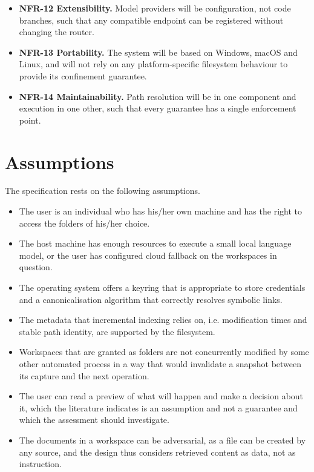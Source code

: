 \documentclass{FastFyp}
\begin{document}
\begin{itemize}
    \item \textbf{NFR-12 Extensibility.} Model providers will be configuration, not code branches, such that any compatible endpoint can be registered without changing the router.
    \item \textbf{NFR-13 Portability.} The system will be based on Windows, macOS and Linux, and will not rely on any platform-specific filesystem behaviour to provide its confinement guarantee.
    \item \textbf{NFR-14 Maintainability.} Path resolution will be in one component and execution in one other, such that every guarantee has a single enforcement point.
\end{itemize}

\section{Assumptions}
The specification rests on the following assumptions.

\begin{itemize}
    \item The user is an individual who has his/her own machine and has the right to access the folders of his/her choice.
    \item The host machine has enough resources to execute a small local language model, or the user has configured cloud fallback on the workspaces in question.
    \item The operating system offers a keyring that is appropriate to store credentials and a canonicalisation algorithm that correctly resolves symbolic links.
    \item The metadata that incremental indexing relies on, i.e. modification times and stable path identity, are supported by the filesystem.
    \item Workspaces that are granted as folders are not concurrently modified by some other automated process in a way that would invalidate a snapshot between its capture and the next operation.
    \item The user can read a preview of what will happen and make a decision about it, which the literature indicates is an assumption and not a guarantee and which the assessment should investigate.
    \item The documents in a workspace can be adversarial, as a file can be created by any source, and the design thus considers retrieved content as data, not as instruction.
\end{itemize}
\end{document}
